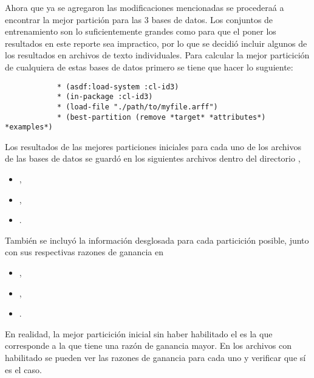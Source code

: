 \begin{itemize}
\begin{solution}
        Ahora que ya se agregaron las modificaciones mencionadas se procederaá a encontrar la mejor partición para las 3 bases de datos. Los conjuntos de entrenamiento son lo suficientemente grandes como para que el poner los resultados en este reporte sea impractico, por lo que se decidió incluir algunos de los resultados en archivos de texto individuales. Para calcular la mejor particición de cualquiera de estas bases de datos primero se tiene que hacer lo suguiente:
        \begin{verbatim}
            * (asdf:load-system :cl-id3)
            * (in-package :cl-id3)
            * (load-file "./path/to/myfile.arff")
            * (best-partition (remove *target* *attributes*) *examples*)
        \end{verbatim}
        
        Los resultados de las mejores particiones iniciales para cada uno de los archivos de las bases de datos se guardó en los siguientes archivos dentro del directorio ,
        \begin{itemize}
            \item {}, 
            \item {}, 
            \item {}.
        \end{itemize}
        También se incluyó la información desglosada para cada particición posible, junto con sus respectivas razones de ganancia en
        \begin{itemize}
            \item {}, 
            \item {}, 
            \item {}.
        \end{itemize}
        En realidad, la mejor particición inicial sin haber habilitado el  es la que corresponde a la que tiene una razón de ganancia mayor. En los archivos con  habilitado se pueden ver las razones de ganancia para cada uno y verificar que sí es el caso.
        

\end{solution}
\end{itemize}
